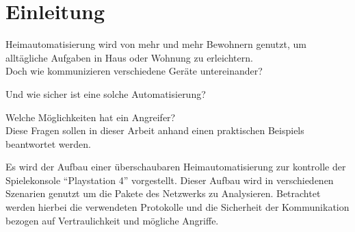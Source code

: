 \newpage
\section{Einleitung}\label{sec:einleitung}
Heimautomatisierung wird von mehr und mehr Bewohnern genutzt,
um alltägliche Aufgaben in Haus oder Wohnung zu erleichtern.\\

Doch wie kommunizieren verschiedene Geräte untereinander?

Und wie sicher ist eine solche Automatisierung?

Welche Möglichkeiten hat ein Angreifer?\\

Diese Fragen sollen in dieser Arbeit anhand einen praktischen Beispiels beantwortet werden.

Es wird der Aufbau einer überschaubaren Heimautomatisierung zur kontrolle der Spielekonsole \enquote{Playstation 4} vorgestellt.
Dieser Aufbau wird in verschiedenen Szenarien genutzt um die Pakete des Netzwerks zu Analysieren.
Betrachtet werden hierbei die verwendeten Protokolle und die Sicherheit der Kommunikation bezogen auf Vertraulichkeit und mögliche Angriffe.
